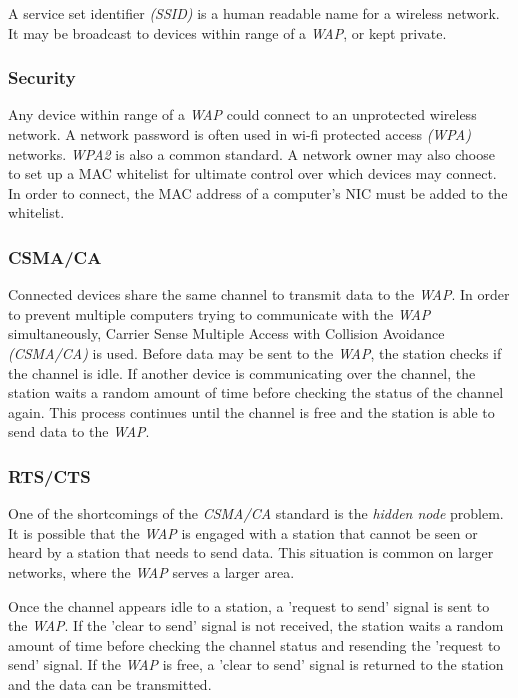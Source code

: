 \documentclass[9pt]{article}
\begin{document}
A service set identifier \emph{(SSID)} is a human readable name for a wireless network. It may be broadcast to devices within range of a \emph{WAP}, or kept private.

\subsubsection{Security}
\label{sec:org9e76662}

Any device within range of a \emph{WAP} could connect to an unprotected wireless network. A network password is often used in wi-fi protected access \emph{(WPA)} networks. \emph{WPA2} is also a common standard. A network owner may also choose to set up a MAC whitelist for ultimate control over which devices may connect. In order to connect, the MAC address of a computer's NIC must be added to the whitelist.

\subsubsection{CSMA/CA}
\label{sec:orgecfd985}

Connected devices share the same channel to transmit data to the \emph{WAP}. In order to prevent multiple computers trying to communicate with the \emph{WAP} simultaneously, Carrier Sense Multiple Access with Collision Avoidance \emph{(CSMA/CA)} is used. Before data may be sent to the \emph{WAP}, the station checks if the channel is idle. If another device is communicating over the channel, the station waits a random amount of time before checking the status of the channel again. This process continues until the channel is free and the station is able to send data to the \emph{WAP}.

\subsubsection{RTS/CTS}
\label{sec:org4e38311}

One of the shortcomings of the \emph{CSMA/CA} standard is the \emph{hidden node} problem. It is possible that the \emph{WAP} is engaged with a station that cannot be seen or heard by a station that needs to send data. This situation is common on larger networks, where the \emph{WAP} serves a larger area.

Once the channel appears idle to a station, a 'request to send' signal is sent to the \emph{WAP}. If the 'clear to send' signal is not received, the station waits a random amount of time before checking the channel status and resending the 'request to send' signal. If the \emph{WAP} is free, a 'clear to send' signal is returned to the station and the data can be transmitted.
\end{document}
